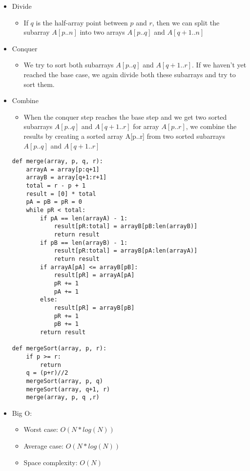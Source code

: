 \documentclass[a4paper, 11.25pt]{article}
\begin{document}
\begin{itemize}
    \item Divide
    \begin{itemize}
        \item If $q$ is the half-array point between $p$ and $r$, then we can split the subarray $A[p..n]$ into two arrays $A[p..q]$ and $A[q+1..n]$
    \end{itemize}
    \item Conquer
    \begin{itemize}
        \item We try to sort both subarrays $A[p..q]$ and $A[q+1..r]$. If we haven't yet reached the base case, we again divide both these subarrays and try to sort them.
    \end{itemize}
    \item Combine
    \begin{itemize}
        \item When the conquer step reaches the base step and we get two sorted subarrays $A[p..q]$ and $A[q+1..r]$ for array $A[p..r]$, we combine the results by creating a sorted array A[p..r] from two sorted subarrays $A[p..q]$ and $A[q+1.. r]$
    \end{itemize}
    \begin{lstlisting}[style=PythonStyle]
def merge(array, p, q, r):
    arrayA = array[p:q+1]
    arrayB = array[q+1:r+1]
    total = r - p + 1
    result = [0] * total
    pA = pB = pR = 0
    while pR < total:
        if pA == len(arrayA) - 1:
            result[pR:total] = arrayB[pB:len(arrayB)]
            return result
        if pB == len(arrayB) - 1:
            result[pR:total] = arrayB[pA:len(arrayA)]
            return result
        if arrayA[pA] <= arrayB[pB]:
            result[pR] = arrayA[pA]
            pR += 1
            pA += 1
        else:
            result[pR] = arrayB[pB]
            pR += 1
            pB += 1
        return result
        
def mergeSort(array, p, r):
    if p >= r:
        return
    q = (p+r)//2
    mergeSort(array, p, q)
    mergeSort(array, q+1, r)
    merge(array, p, q ,r)\end{lstlisting} 
\item Big O:
    \begin{itemize}
        \item Worst case: $O(N*log(N))$
        \item Average case: $O(N*log(N))$
        \item Space complexity: $O(N)$
    \end{itemize}
\end{itemize}
\end{document}
